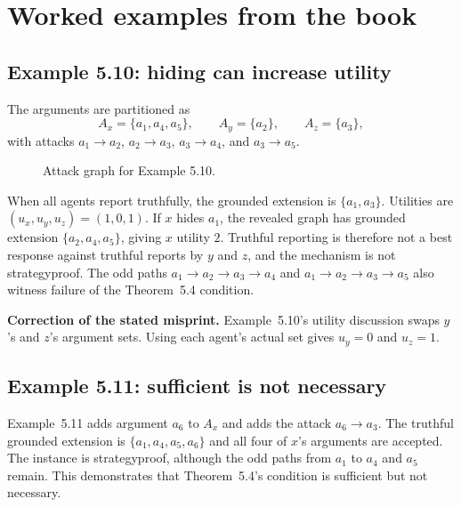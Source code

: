 \documentclass[11pt,a4paper]{article}
\begin{document}
\section{Worked examples from the book}

\subsection{Example 5.10: hiding can increase utility}
The arguments are partitioned as
\[
A_x=\{a_1,a_4,a_5\},\qquad A_y=\{a_2\},\qquad A_z=\{a_3\},
\]
with attacks $a_1\to a_2$, $a_2\to a_3$, $a_3\to a_4$, and $a_3\to a_5$.

\begin{figure}[ht]
\centering
{}
\caption{Attack graph for Example 5.10.}
\label{fig:example510}
\end{figure}

When all agents report truthfully, the grounded extension is $\{a_1,a_3\}$. Utilities are $(u_x,u_y,u_z)=(1,0,1)$. If $x$ hides $a_1$, the revealed graph has grounded extension $\{a_2,a_4,a_5\}$, giving $x$ utility $2$. Truthful reporting is therefore not a best response against truthful reports by $y$ and $z$, and the mechanism is not strategyproof. The odd paths $a_1\to a_2\to a_3\to a_4$ and $a_1\to a_2\to a_3\to a_5$ also witness failure of the Theorem~5.4 condition.

\textbf{Correction of the stated misprint.} Example~5.10's utility discussion swaps $y$'s and $z$'s argument sets. Using each agent's actual set gives $u_y=0$ and $u_z=1$.

\subsection{Example 5.11: sufficient is not necessary}
Example~5.11 adds argument $a_6$ to $A_x$ and adds the attack $a_6\to a_3$. The truthful grounded extension is $\{a_1,a_4,a_5,a_6\}$ and all four of $x$'s arguments are accepted. The instance is strategyproof, although the odd paths from $a_1$ to $a_4$ and $a_5$ remain. This demonstrates that Theorem~5.4's condition is sufficient but not necessary.
\end{document}
